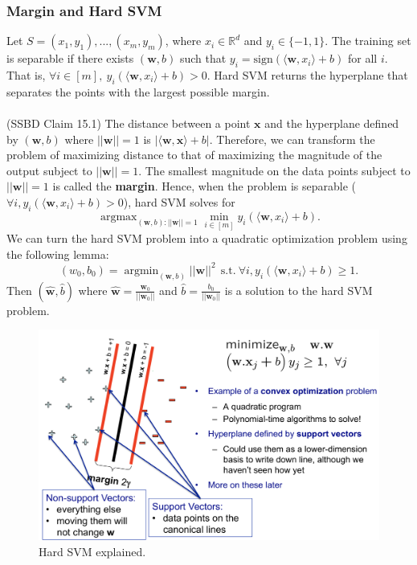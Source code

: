 \documentclass{article}
\begin{document}
   \subsubsection{Margin and Hard SVM}
   Let $S = (x_1, y_1),...,(x_m, y_m)$, where $x_i \in \mathbb{R}^d$ and $y_i \in \{-1,1\}$. The training set is separable if there exists $(\textbf{w},b)$ such that $y_i = \text{sign}(\langle \textbf{w}, x_i \rangle + b)$ for all $i$. That is, $\forall i \in [m],\ y_i(\langle \textbf{w}, x_i \rangle + b) > 0.$ Hard SVM returns the hyperplane that separates the points with the largest possible margin.
   \\\\
   (SSBD Claim 15.1) The distance between a point $\mathbf{x}$ and the hyperplane defined by $(\mathbf{w}, b)$ where $||\mathbf{w}|| = 1$ is $|\langle \mathbf{w}, \mathbf{x} \rangle + b|$. Therefore, we can transform the problem of maximizing distance to that of maximizing the magnitude of the output subject to $||\mathbf{w}|| = 1$. The smallest magnitude on the data points subject to $||\mathbf{w}|| = 1$ is called the \textbf{margin}. Hence, when the problem is separable ($\forall i, y_i(\langle \textbf{w}, x_i \rangle + b) > 0$), hard SVM solves for
   \begin{equation}
   \mathop{\arg \max}_{(\mathbf{w},b):||\mathbf{w}||=1} \min_{i \in [m]} y_i(\langle \textbf{w}, x_i \rangle + b).
   \end{equation}
   We can turn the hard SVM problem into a quadratic optimization problem using the following lemma:
   \begin{equation}
   (w_0, b_0) = \mathop{\arg \min}_{(\mathbf{w}, b)} ||\mathbf{w}||^2\ \ \text{s.t.}\  \forall i, y_i(\langle \textbf{w}, x_i \rangle + b) \geq 1.
   \end{equation}
   Then $(\hat{\mathbf{w}}, \hat{b})$ where $\hat{\mathbf{w}} = \frac{\mathbf{w}_0}{||\mathbf{w}_0||}$ and $\hat{b} = \frac{b_0}{||\mathbf{w}_0||}$ is a solution to the hard SVM problem. \\
   
   \begin{figure}
   \centering
   \includegraphics[width=.8\linewidth]{hard_svm}
   \caption{Hard SVM explained.}
   \end{figure}
   
\end{document}
